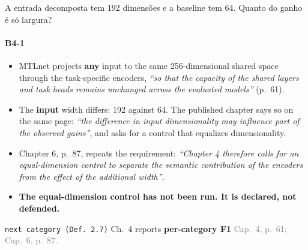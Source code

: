 \documentclass{beamer}
\begin{document}
\begin{frame}[noframenumbering]{A entrada decomposta tem 192 dimensões e a baseline tem 64. Quanto do ganho é só largura?}
    \framesubtitle{B4-1}
    \hypertarget{b41}{}
    \small
    \begin{itemize}\setlength{\itemsep}{0pt}\setlength{\parskip}{0pt}
        \item MTLnet projects \textbf{any} input to the same 256-dimensional shared space through the task-specific encoders, \textit{``so that the capacity of the shared layers and task heads remains unchanged across the evaluated models''} (p.~61).
        \item The \textbf{input} width differs: 192 against 64. The published chapter says so on the same page: \textit{``the difference in input dimensionality may influence part of the observed gains''}, and asks for a control that equalizes dimensionality.
        \item Chapter 6, p.~87, repeats the requirement: \textit{``Chapter 4 therefore calls for an equal-dimension control to separate the semantic contribution of the encoders from the effect of the additional width''}.
        \item \textcolor{alert}{\textbf{The equal-dimension control has not been run. It is declared, not defended.}}
    \end{itemize}
    \vfill
    {\scriptsize\texttt{next category (Def.~2.7)} \textbullet{} Ch.~4 reports \textbf{per-category F1} \textbullet{} \textcolor{gray}{Cap.~4, p.~61; Cap.~6, p.~87.}\hfill\hyperlink{b0}{}}
\end{frame}
\end{document}
